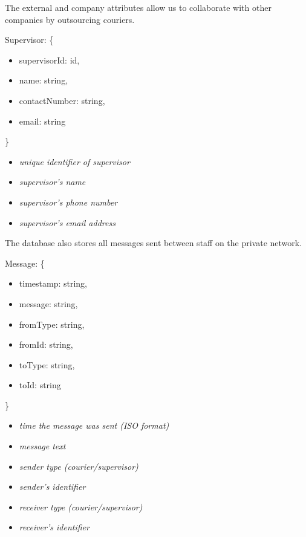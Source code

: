 The external and company attributes allow us to collaborate with other companies by outsourcing couriers.

\begin{minipage}{6.5cm}
Supervisor: \{
\begin{itemize}
    \itemsep-0.5em
    \item[] supervisorId: id,
    \item[] name: string,
    \item[] contactNumber: string,
    \item[] email: string
\end{itemize}
\}
\end{minipage}
\begin{minipage}{10cm}
\hspace{1cm}
\begin{itemize}
    \itemsep-0.5em
    \item[] \textit{unique identifier of supervisor}
    \item[] \textit{supervisor's name}
    \item[] \textit{supervisor's phone number}
    \item[] \textit{supervisor's email address}
\end{itemize}
\hspace{1cm}
\end{minipage}

The database also stores all messages sent between staff on the private network.

\begin{minipage}{6.5cm}
Message: \{
\begin{itemize}
    \itemsep-0.5em
    \item[] timestamp: string,
    \item[] message: string,
    \item[] fromType: string,
    \item[] fromId: string,
    \item[] toType: string,
    \item[] toId: string
\end{itemize}
\}
\end{minipage}
\begin{minipage}{10cm}
\hspace{1cm}
\begin{itemize}
    \itemsep-0.5em
    \item[] \textit{time the message was sent (ISO format)}
    \item[] \textit{message text}
    \item[] \textit{sender type (courier/supervisor)}
    \item[] \textit{sender's identifier}
    \item[] \textit{receiver type (courier/supervisor)}
    \item[] \textit{receiver's identifier}
\end{itemize}
\hspace{1cm}
\end{minipage}

